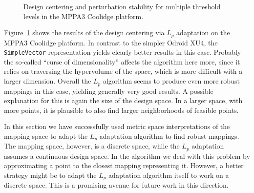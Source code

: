 \begin{figure}[h]
	\centering
	\caption{Design centering and perturbation stability for multiple threshold levels in the MPPA3 Coolidge platform.}
	\label{fig:design_centering_coolidge}
\end{figure}

Figure~\ref{fig:design_centering_coolidge} shows the results of the design centering via $L_p$ adaptation on the MPPA3 Coolidge platform.
In contrast to the simpler Odroid XU4, the \texttt{SimpleVector} representation yields clearly better results in this case.
Probably the so-called ``curse of dimensionality'' affects the algorithm here more, since it relies on traversing the hypervolume of the space, which is more difficult with a larger dimension.
Overall the $L_p$ algorithm seems to produce even more robust mappings in this case, yielding generally very good results.
A possible explanation for this is again the size of the design space.
In a larger space, with more points, it is plausible to also find larger neighborhoods of feasible points.

In this section we have successfully used metric space interpretations of the mapping space to adapt the $L_p$ adaptation algorithm to find robust mappings.
The mapping space, however, is a discrete space, while the $L_p$ adaptation assumes a continuous design space.
In the algorithm we deal with this problem by approximating a point to the closest mapping representing it.
However, a better strategy might be to adapt the $L_p$ adaptation algorithm itself to work on a discrete space.
This is a promising avenue for future work in this direction.
